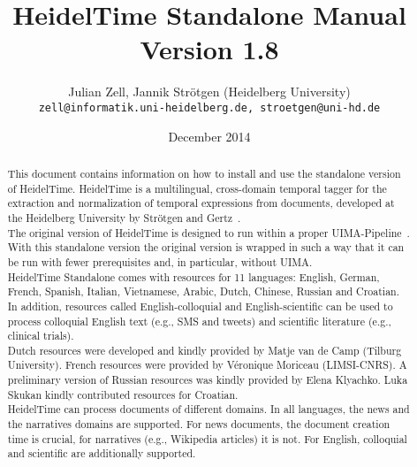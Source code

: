 \documentclass[
     11pt,         %
     a4paper,      %
     oneside,
     ]{article}
\newcommand{\languages}{English, German, French, Spanish, Italian, Vietnamese, Arabic, Dutch, Chinese, Russian and Croatian}
\begin{document}
\title{%
HeidelTime Standalone Manual\\Version 1.8
}
\author{Julian Zell, Jannik Str\"otgen (Heidelberg University)\\[0.2em]
\small \texttt{zell@informatik.uni-heidelberg.de, stroetgen@uni-hd.de}
}
\date{December 2014}
\maketitle

\begin{abstract}
This document contains information on how to install and use the standalone version of HeidelTime. HeidelTime is a multilingual, cross-domain temporal tagger for the extraction and normalization of temporal expressions from documents, developed at the Heidelberg University by Str\"otgen and Gertz~\cite{StroetgenGertz2010_SemEval, HeidelTime, StroetgenGertz2013_LRE}.\\
The original version of HeidelTime is designed to run within a proper UIMA-Pipeline~\cite{UIMA}. With this standalone version the original version is wrapped in such a way that it can be run with fewer prerequisites and, in particular, without UIMA.\\
HeidelTime Standalone comes with resources for 11 languages: \languages. In addition, resources called English-colloquial and English-scientific can be used to process colloquial English text (e.g., SMS and tweets) and scientific literature (e.g., clinical trials). \\
Dutch resources were developed and kindly provided by Matje van de Camp (Tilburg University)\cite{CampChristiansen2012}. French resources were provided by Véronique Moriceau (LIMSI-CNRS)\cite{FrenchHeideltime}. A preliminary version of Russian resources was kindly provided by Elena Klyachko\cite{Elena}. Luka Skukan\cite{SkukanEtAl2014} kindly contributed resources for Croatian. \\
HeidelTime can process documents of different domains. In all languages, the news and the narratives domains are supported. For news documents, the document creation time is crucial, for narratives (e.g., Wikipedia articles) it is not. For English, colloquial and scientific are additionally supported.
\end{abstract}

\newpage
\tableofcontents
\newpage





\end{document}

